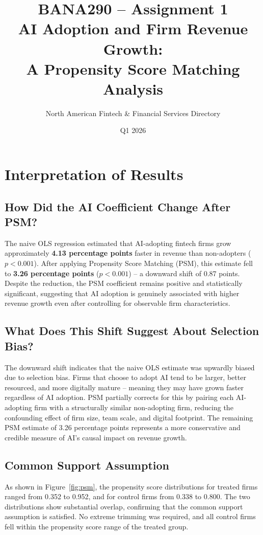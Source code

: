 \documentclass[12pt]{article}
\title{\textbf{BANA290 -- Assignment 1} \\ 
       \large AI Adoption and Firm Revenue Growth: \\
       A Propensity Score Matching Analysis}
\author{North American Fintech \& Financial Services Directory}
\date{Q1 2026}
\begin{document}
\maketitle

\section*{Interpretation of Results}

\subsection*{How Did the AI Coefficient Change After PSM?}

The naive OLS regression estimated that AI-adopting fintech firms 
grow approximately \textbf{4.13 percentage points} faster in revenue 
than non-adopters ($p < 0.001$). After applying Propensity Score 
Matching (PSM), this estimate fell to \textbf{3.26 percentage points} 
($p < 0.001$) -- a downward shift of 0.87 points. Despite the 
reduction, the PSM coefficient remains positive and statistically 
significant, suggesting that AI adoption is genuinely associated 
with higher revenue growth even after controlling for observable 
firm characteristics.

\subsection*{What Does This Shift Suggest About Selection Bias?}

The downward shift indicates that the naive OLS estimate was upwardly 
biased due to selection bias. Firms that choose to adopt AI tend to 
be larger, better resourced, and more digitally mature -- meaning 
they may have grown faster regardless of AI adoption. PSM partially 
corrects for this by pairing each AI-adopting firm with a 
structurally similar non-adopting firm, reducing the confounding 
effect of firm size, team scale, and digital footprint. The remaining 
PSM estimate of 3.26 percentage points represents a more conservative 
and credible measure of AI's causal impact on revenue growth.

\subsection*{Common Support Assumption}

As shown in Figure~\ref{fig:psm}, the propensity score distributions 
for treated firms ranged from 0.352 to 0.952, and for control firms 
from 0.338 to 0.800. The two distributions show substantial overlap, 
confirming that the common support assumption is satisfied. No 
extreme trimming was required, and all control firms fell within the 
propensity score range of the treated group.
\end{document}
